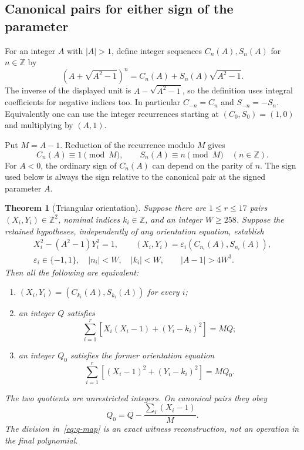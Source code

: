 \documentclass[11pt,letterpaper]{article}
\newtheorem{theorem}{Theorem}[section]
\theoremstyle{definition}\newtheorem{definition}[theorem]{Definition}
\theoremstyle{remark}\newtheorem{remark}[theorem]{Remark}
\newcommand{\Z}{\mathbb Z}\newcommand{\N}{\mathbb N}\newcommand{\Pos}{\mathbb Z_{>0}}
\begin{document}
\subsection{Canonical pairs for either sign of the parameter}
For an integer $A$ with $|A|>1$, define integer sequences $C_n(A),S_n(A)$ for $n\in\Z$ by
\begin{equation}\label{eq:pell-def}
(A+\sqrt{A^2-1})^n=C_n(A)+S_n(A)\sqrt{A^2-1}.
\end{equation}
The inverse of the displayed unit is $A-\sqrt{A^2-1}$, so the definition uses integral coefficients for negative indices too. In particular $C_{-n}=C_n$ and $S_{-n}=-S_n$. Equivalently one can use the integer recurrences starting at $(C_0,S_0)=(1,0)$ and multiplying by $(A,1)$.

Put $M=A-1$. Reduction of the recurrence modulo $M$ gives
\begin{equation}\label{eq:pell-residues}
C_n(A)\equiv1\pmod M,\qquad S_n(A)\equiv n\pmod M
\quad(n\in\Z).
\end{equation}
For $A<0$, the ordinary sign of $C_n(A)$ can depend on the parity of $n$. The sign used below is always the sign relative to the canonical pair at the signed parameter $A$.

\begin{theorem}[Triangular orientation]\label{thm:tri}
Suppose there are $1\le r\le17$ pairs $(X_i,Y_i)\in\Z^2$, nominal indices $k_i\in\Z$, and an integer $W\ge258$. Suppose the retained hypotheses, independently of any orientation equation, establish
\begin{gather}\label{eq:hyp}
X_i^2-(A^2-1)Y_i^2=1,\qquad
(X_i,Y_i)=\varepsilon_i(C_{n_i}(A),S_{n_i}(A)),\\
\varepsilon_i\in\{-1,1\},\quad |n_i|<W,\quad |k_i|<W,
\qquad |A-1|>4W^3.\nonumber
\end{gather}
Then all the following are equivalent:
\begin{enumerate}
\item $(X_i,Y_i)=(C_{k_i}(A),S_{k_i}(A))$ for every $i$;
\item an integer $Q$ satisfies
\begin{equation}\label{eq:tri-raw}
\sum_{i=1}^r\left[X_i(X_i-1)+(Y_i-k_i)^2\right]=M Q;
\end{equation}
\item an integer $Q_0$ satisfies the former orientation equation
\begin{equation}\label{eq:old-raw}
\sum_{i=1}^r\left[(X_i-1)^2+(Y_i-k_i)^2\right]=M Q_0.
\end{equation}
\end{enumerate}
The two quotients are unrestricted integers. On canonical pairs they obey
\begin{equation}\label{eq:q-map}
Q_0=Q-\frac{\sum_i(X_i-1)}{M}.
\end{equation}
The division in~\eqref{eq:q-map} is an exact witness reconstruction, not an operation in the final polynomial.
\end{theorem}
\end{document}
